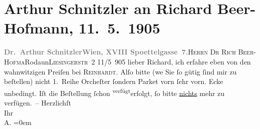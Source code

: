 

         
         \renewcommand{\erwaehntePersonen}{Personen: Richard Beer-Hofmann, Max Reinhardt}
         \renewcommand{\erwaehnteOrte}{Orte: Edmund-Weiß-Gasse, Liesingerstraße, Rodaun, Wien, XVIII., Währing}
         \renewcommand{\erwaehnteWerke}{Werke: Der Graf von Charolais. Ein Trauerspiel}
               \section[Arthur Schnitzler an Richard Beer-Hofmann, 11. 5. 1905]{ Arthur Schnitzler an Richard Beer-Hofmann, 11. 5. 1905}\nopagebreak{}\rehead{ }\begin{ledgroupsized}[t]{13cm}\normalsize\beginnumbering \toendnotes[C]{\smallbreak\pagebreak[2]} 
\toendnotes[C]{\smallbreak}\pstart{}{\pb}\textcolor{gray}{\textbf{Dr. Arthur Schnitzler}}\pend{}\pstart{}\textcolor{gray}{\textbf{Wien, XVIII Spoettelgasse 7.}}\pend{}{\bigskip}\pstart{}{\pb}\textsc{Herrn Dr Rich Beer-Hofma{\geminationn}}\pend{}\pstart{}Rodaun\pend{}\pstart{}\textsc{Liesingerstr 2}\pend{}{\bigskip}\pstart
           \raggedleft{}{\pb}11/5 905\pend
           \pstart{}lieber Richard, \pend\pstart
           ich erfahre eben von den wahnwitzigen Preiſen bei \textsc{Reinhardt}. Alſo bitte (we{\geminationn} Sie ſo gütig ſind mir zu beſtellen) nicht
               1. Reihe Orcheſter ſondern Parket vorn ſehr vorn. Ecke unbedingt. Iſt die Beſtellung ſchon \substVorne{}\textsuperscript{verfügt}{\allowbreak}\substDazwischen{}erfolgt\substHinten{}, ſo bitte \uline{nichts}{ }{\pb}mehr zu verfügen. –\pend
           \pstart
           Herzlichſt{\\[\baselineskip]}Ihr{\\[\baselineskip]}\spacefill\mbox{A.}\pend
           \leftskip=0em{}
         
         \endnumbering{}\end{ledgroupsized}  \newcommand{\dateiname}{L01516}\newcommand{\titel}{Arthur Schnitzler an Richard Beer-Hofmann, 11. 5. 1905}\newcommand{\editorInnen}{Martin Anton Müller und Gerd-Hermann Susen}
      